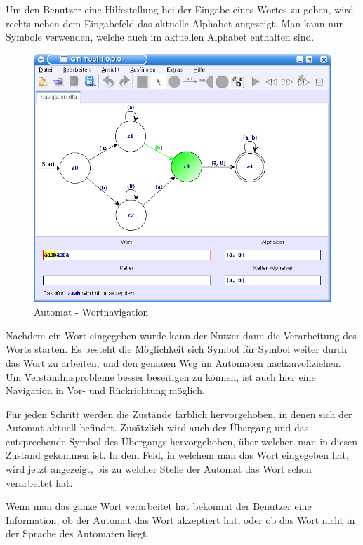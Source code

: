 Um den Benutzer eine Hilfestellung bei der Eingabe eines Wortes zu geben, wird
rechts neben dem Eingabefeld das aktuelle Alphabet angezeigt. Man kann nur
Symbole verwenden, welche auch im aktuellen Alphabet enthalten
sind.\vspace{10pt}

  \begin{figure}[h]
  \begin{center}
  \includegraphics[width=12cm]{../images/dfa_navigation.png}
  \caption{Automat - Wortnavigation}
  \end{center}
  \end{figure}

Nachdem ein Wort eingegeben wurde kann der Nutzer dann die Verarbeitung des
Worts starten. Es besteht die Möglichkeit sich Symbol für Symbol weiter durch
das Wort zu arbeiten, und den genauen Weg im Automaten nachzuvollziehen. Um
Verständnisprobleme besser beseitigen zu können, ist auch hier eine Navigation
in Vor- und Rückrichtung möglich.\vspace{10pt}
\vspace{10pt}

Für jeden Schritt werden die Zustände farblich hervorgehoben, in denen sich der
Automat aktuell befindet. Zusätzlich wird auch der Übergang und das
entsprechende Symbol des Übergangs hervorgehoben, über welchen man in diesen
Zustand gekommen ist. In dem Feld, in welchem man das Wort eingegeben hat, wird
jetzt angezeigt, bis zu welcher Stelle der Automat das Wort schon verarbeitet
hat.\vspace{10pt}

Wenn man das ganze Wort verarbeitet hat bekommt der Benutzer eine Information,
ob der Automat das Wort akzeptiert hat, oder ob das Wort nicht in der Sprache
des Automaten liegt.\vspace{10pt}


